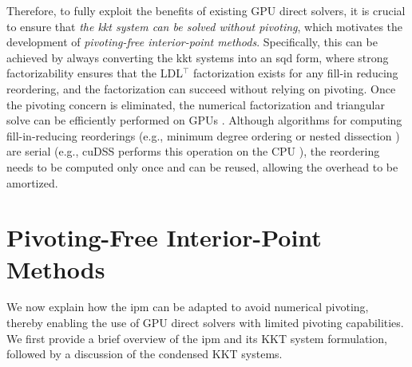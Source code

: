\documentclass{article}
\begin{document}
Therefore, to fully exploit the benefits of existing GPU direct solvers, it is crucial to ensure that \emph{the \gls*{kkt} system can be solved without pivoting}, which motivates the development of \emph{pivoting-free interior-point methods}.
Specifically, this can be achieved by always converting the \gls*{kkt} systems into an \gls*{sqd} form, where strong factorizability ensures that the LDL$^\top$ factorization exists for any fill-in reducing reordering, and the factorization can succeed without relying on pivoting.
Once the pivoting concern is eliminated, the numerical factorization and triangular solve can be efficiently performed on GPUs \cite{naumovParallelSolutionSparse}. 
Although algorithms for computing fill-in-reducing reorderings (e.g., minimum degree ordering \cite{amestoyApproximateMinimumDegree1996} or nested dissection \cite{karypisMETISSoftwarePackage1997}) are serial (e.g., cuDSS performs this operation on the CPU \cite{nvidiaNVIDIACuDSSPreview}), the reordering needs to be computed only once and can be reused, allowing the overhead to be amortized.


\section{Pivoting-Free Interior-Point Methods}\label{eqn:ipm}
We now explain how the \gls*{ipm} can be adapted to avoid numerical pivoting, thereby enabling the use of GPU direct solvers with limited pivoting capabilities. We first provide a brief overview of the \gls*{ipm} and its KKT system formulation, followed by a discussion of the condensed KKT systems.
\end{document}
